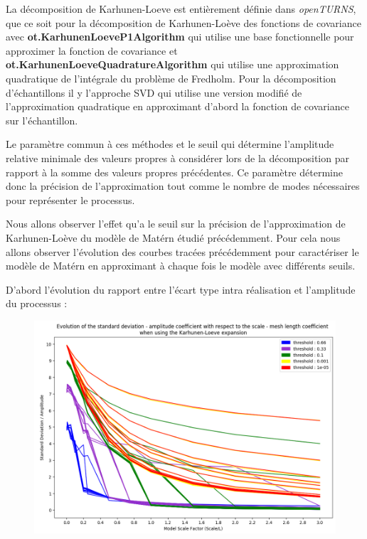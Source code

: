 \documentclass[a4paper,10pt]{article}
\begin{document}
	 La décomposition de Karhunen-Loeve est entièrement définie dans \textit{openTURNS}, que ce soit pour la décomposition de Karhunen-Loève des fonctions de covariance avec \textbf{ot.KarhunenLoeveP1Algorithm} qui utilise une base fonctionnelle pour 	approximer la fonction de covariance et \\ \textbf{ot.KarhunenLoeveQuadratureAlgorithm} qui utilise une approximation quadratique de l'intégrale du problème de Fredholm. Pour la décomposition d'échantillons il y l'approche SVD qui utilise une version modifié de l'approximation quadratique en approximant d'abord la fonction de covariance sur l'échantillon. \par 
	 
	 Le paramètre commun à ces méthodes et le seuil qui détermine l'amplitude relative minimale des valeurs propres à considérer lors de la décomposition par rapport à la somme des valeurs propres précédentes. Ce paramètre détermine donc la précision de l'approximation tout comme le nombre de modes nécessaires pour représenter le processus. \par 
	 
	 Nous allons observer l'effet qu'a le seuil sur la précision de l'approximation de Karhunen-Loève du modèle de Matérn étudié précédemment. Pour cela nous allons observer l'évolution des courbes tracées précédemment pour caractériser le modèle de Matérn en approximant à chaque fois le modèle avec différents seuils. 
	 
	 D'abord l'évolution du rapport entre l'écart type intra réalisation et l'amplitude du processus : 
	 
\begin{figure}[H]
   \centering   
   \noindent \includegraphics[width = \linewidth]{stdDevIntraKL.png}
      \caption{}
         \label{stdDevIntraKL}
\end{figure}
	 
\end{document}
